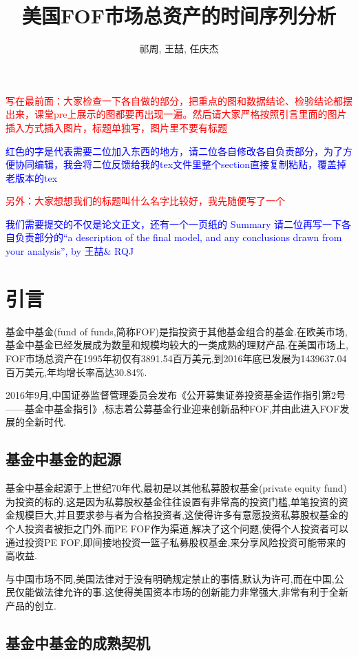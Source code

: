 \documentclass[10.5pt,onecolumn,a4paper]{article}%
\title{美国FOF市场总资产的时间序列分析}
\author{祁周, 王喆, 任庆杰}
\begin{document}
\maketitle{}

\textcolor{red}{写在最前面：大家检查一下各自做的部分，把重点的图和数据结论、检验结论都摆出来，课堂pre上展示的图都要再出现一遍。然后请大家严格按照引言里面的图片插入方式插入图片，标题单独写，图片里不要有标题}

\textcolor{blue}{红色的字是代表需要二位加入东西的地方，请二位各自修改各自负责部分，为了方便协同编辑，我会将二位反馈给我的tex文件里整个section直接复制粘贴，覆盖掉老版本的tex}

\textcolor{red}{另外：大家想想我们的标题叫什么名字比较好，我先随便写了一个}

\textcolor{blue}{我们需要提交的不仅是论文正文，还有一个一页纸的 Summary 请二位再写一下各自负责部分的``a description of the final model, and any conclusions drawn from your analysis'', by 王喆\& RQJ}

\section{引言}
基金中基金(fund of funds,简称FOF)是指投资于其他基金组合的基金.在欧美市场,基金中基金已经发展成为数量和规模均较大的一类成熟的理财产品.在美国市场上, FOF市场总资产在1995年初仅有3891.54百万美元,到2016年底已发展为1439637.04百万美元,年均增长率高达30.84\%.

2016年9月,中国证券监督管理委员会发布《公开募集证券投资基金运作指引第2号------基金中基金指引》,标志着公募基金行业迎来创新品种FOF,并由此进入FOF发展的全新时代.
\subsection{基金中基金的起源}

基金中基金起源于上世纪70年代,最初是以其他私募股权基金(private equity fund)为投资的标的.这是因为私募股权基金往往设置有非常高的投资门槛,单笔投资的资金规模巨大,并且要求参与者为合格投资者,这使得许多有意愿投资私募股权基金的个人投资者被拒之门外.而PE FOF作为渠道,解决了这个问题,使得个人投资者可以通过投资PE FOF,即间接地投资一篮子私募股权基金,来分享风险投资可能带来的高收益.

与中国市场不同,美国法律对于没有明确规定禁止的事情,默认为许可,而在中国,公民仅能做法律允许的事.这使得美国资本市场的创新能力非常强大,非常有利于全新产品的创立.

\subsection{基金中基金的成熟契机}
\end{document}
